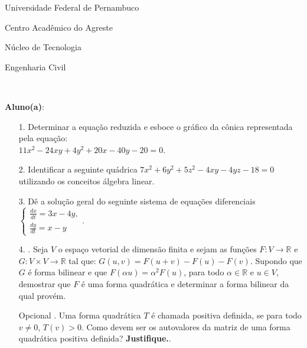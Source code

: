 \documentclass[oneside,a4paper,12pt]{article}
\newcommand{\universidade}{Universidade Federal de Pernambuco}
\newcommand{\centro}{Centro Acadêmico do Agreste}
\newcommand{\departamento}{Núcleo de Tecnologia}
\newcommand{\curso}{Engenharia Civil}
\begin{document}
  \vspace{12pt}
  
     \begin{center}
     	\vspace{0pt}
     	
     	\universidade
     	\par
     	\centro
     	\par
     	\departamento
     	\par
     	\curso
     	\par
     	\vspace{08pt}
     	\\
     \end{center}
     
     \begin{flushleft}
     	\textbf{Aluno(a)}:
     \end{flushleft}
 
 \begin{itemize}
 	\item[1.]  Determinar a equação reduzida e esboce o gráfico da cônica representada pela equação:\\ $11x^{2}-24xy+4y^{2}+20x-40y-20=0$.
 \end{itemize}
 \begin{itemize}
 	\item[2.] Identificar a seguinte quádrica $7x^{2}+6y^{2}+5z^{2}-4xy-4yz-18=0$ utilizando os conceitos álgebra linear.
\end{itemize}
 \begin{itemize}
 	\item [3.] Dê a solução geral do seguinte sistema de equações diferenciais
 	$\begin{cases}
 	\frac{dx}{dt}=3x-4y,\\
 	\frac{dy}{dt}=x-y
 	\end{cases}$.
 \end{itemize}
 \begin{itemize}
 	\item[4.]. Seja $V$ o espaço vetorial de dimensão finita e sejam as funções $F:V\longrightarrow \mathbb{R}$ e $G: V \times V \longrightarrow \mathbb{R}$ tal que: $G(u,v)=F(u+v)-F(u)-F(v)$. Supondo que $G$ é forma bilinear e que $F(\alpha u)=\alpha^{2}F(u)$, para todo $\alpha\in \mathbb{R}$ e $u\in V$, demostrar que $F$ é uma forma quadrática e determinar a forma bilinear da qual provém.
\end{itemize}
\begin{itemize}
	\item[Opcional]. Uma forma quadrática $T$ é chamada positiva definida, se para todo $v\neq 0$, $T(v)>0$. Como devem ser os autovalores da matriz de uma forma quadrática positiva definida? \textbf{Justifique.}.
	
\end{itemize}	
\flushbottom
\flushright
\end{document}
